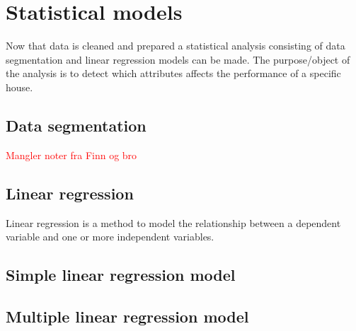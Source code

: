 \chapter{Statistical models}
Now that data is cleaned and prepared a statistical analysis consisting of data segmentation and linear regression models can be made. The purpose/object of the analysis is to detect which attributes affects the performance of a specific house. 

\section{Data segmentation}
\textcolor{red}{Mangler noter fra Finn og bro}

\section{Linear regression}
Linear regression is a method to model the relationship between a dependent variable and one or more independent variables.

\section{Simple linear regression model}

\section{Multiple linear regression model}